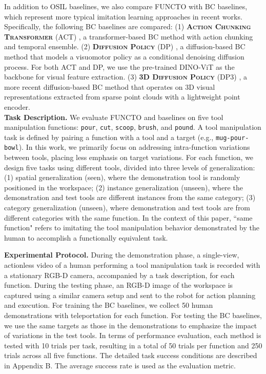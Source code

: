 In addition to OSIL baselines, we also compare FUNCTO with BC baselines, which represent more typical imitation learning approaches in recent works. Specifically, the following BC baselines are compared: (1) \textbf{\textsc{Action Chunking Transformer}} (ACT) \cite{zhao2023learning}, a transformer-based BC method with action chunking and temporal ensemble. (2) \textbf{\textsc{Diffusion Policy}} (DP) \cite{chi2023diffusion}, a diffusion-based BC method that models a visuomotor policy as a conditional denoising diffusion process. For both ACT and DP, we use the pre-trained DINO-ViT as the backbone for visual feature extraction. (3) \textbf{\textsc{3D Diffusion Policy}} (DP3) \cite{ze20243d}, a more recent diffusion-based BC method that operates on 3D visual representations extracted from sparse point clouds with a lightweight point encoder. \\

\noindent \textbf{Task Description.} We evaluate FUNCTO and baselines on five tool manipulation functions: \texttt{pour}, \texttt{cut}, \texttt{scoop}, \texttt{brush}, and \texttt{pound}. A tool manipulation task is defined by pairing a function with a tool and a target  (e.g., \texttt{mug-pour-bowl}). In this work, we primarily focus on addressing intra-function variations between tools, placing less emphasis on target variations. For each function, we design five tasks using different tools, divided into three levels of generalization: (1) spatial generalization (seen), where the demonstration tool is randomly positioned in the workspace; (2) instance generalization (unseen), where the demonstration and test tools are different instances from the same category; (3) category generalization (unseen), where demonstration and test tools are from different categories with the same function. In the context of this paper, ``same function" refers to imitating the tool manipulation behavior demonstrated by the human to accomplish a functionally equivalent task. 

\noindent \textbf{Experimental Protocol.} During the demonstration phase, a single-view, actionless video of a human performing a tool manipulation task is recorded with a stationary RGB-D camera, accompanied by a task description, for each function. During the testing phase, an RGB-D image of the workspace is captured using a similar camera setup and sent to the robot for action planning and execution. For training the BC baselines, we collect 50 human demonstrations with teleportation for each function. For testing the BC baselines, we use the same targets as those in the demonstrations to emphasize the impact of variations in the test tools. In terms of performance evaluation, each method is tested with 10 trials per task, resulting in a total of 50 trials per function and 250 trials across all five functions. The detailed task success conditions are described in Appendix B. The average success rate is used as the evaluation metric.


